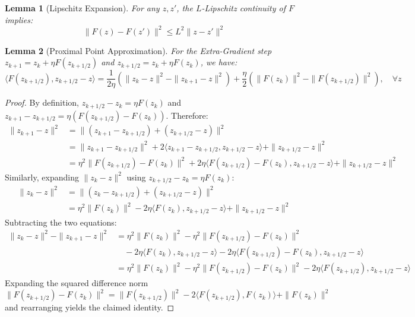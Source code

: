 \documentclass{article}
\newtheorem{lemma}{Lemma}
\begin{document}
\begin{lemma}[Lipschitz Expansion]
For any $z, z'$, the $L$-Lipschitz continuity of $F$ implies:
$$
\|F(z) - F(z')\|^2 \leq L^2 \|z - z'\|^2
$$
\end{lemma}

\begin{lemma}[Proximal Point Approximation]
For the Extra-Gradient step $z_{k+1} = z_k + \eta F(z_{k+1/2})$ and $z_{k+1/2} = z_k + \eta F(z_k)$, we have:
$$
\langle F(z_{k+1/2}), z_{k+1/2} - z \rangle = \frac{1}{2\eta} \left( \|z_k - z\|^2 - \|z_{k+1} - z\|^2 \right) + \frac{\eta}{2} \left( \|F(z_k)\|^2 - \|F(z_{k+1/2})\|^2 \right), \quad \forall z
$$
\end{lemma}
\begin{proof}
By definition, $z_{k+1/2} - z_k = \eta F(z_k)$ and $z_{k+1} - z_{k+1/2} = \eta (F(z_{k+1/2}) - F(z_k))$. Therefore:
\begin{align*}
\|z_{k+1} - z\|^2 &= \|(z_{k+1} - z_{k+1/2}) + (z_{k+1/2} - z)\|^2 \\
&= \|z_{k+1} - z_{k+1/2}\|^2 + 2\langle z_{k+1} - z_{k+1/2}, z_{k+1/2} - z \rangle + \|z_{k+1/2} - z\|^2 \\
&= \eta^2 \|F(z_{k+1/2}) - F(z_k)\|^2 + 2\eta \langle F(z_{k+1/2}) - F(z_k), z_{k+1/2} - z \rangle + \|z_{k+1/2} - z\|^2
\end{align*}
Similarly, expanding $\|z_k - z\|^2$ using $z_{k+1/2} - z_k = \eta F(z_k)$:
\begin{align*}
\|z_k - z\|^2 &= \|(z_k - z_{k+1/2}) + (z_{k+1/2} - z)\|^2 \\
&= \eta^2 \|F(z_k)\|^2 - 2\eta \langle F(z_k), z_{k+1/2} - z \rangle + \|z_{k+1/2} - z\|^2
\end{align*}
Subtracting the two equations:
\begin{align*}
\|z_k - z\|^2 - \|z_{k+1} - z\|^2 &= \eta^2 \|F(z_k)\|^2 - \eta^2 \|F(z_{k+1/2}) - F(z_k)\|^2 \\
&\quad - 2\eta \langle F(z_k), z_{k+1/2} - z \rangle - 2\eta \langle F(z_{k+1/2}) - F(z_k), z_{k+1/2} - z \rangle \\
&= \eta^2 \|F(z_k)\|^2 - \eta^2 \|F(z_{k+1/2}) - F(z_k)\|^2 - 2\eta \langle F(z_{k+1/2}), z_{k+1/2} - z \rangle
\end{align*}
Expanding the squared difference norm $\|F(z_{k+1/2}) - F(z_k)\|^2 = \|F(z_{k+1/2})\|^2 - 2\langle F(z_{k+1/2}), F(z_k) \rangle + \|F(z_k)\|^2$ and rearranging yields the claimed identity.
\end{proof}
\end{document}
